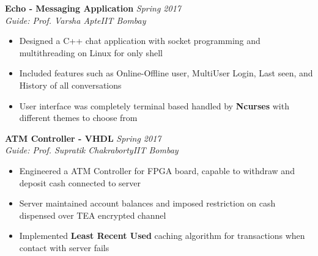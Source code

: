 \documentclass{article}
\begin{document}
\textbf{Echo - Messaging Application} \hfill{\sl \small Spring 2017}
  \vspace{1pt}\\
  {\it Guide: Prof. Varsha Apte}\hfill{\sl \small IIT Bombay}\\
  \vspace{-17pt}
    \begin{itemize}[itemsep = -0.75 mm, leftmargin=*]
      \item Designed a C++ chat application with socket programming and multithreading on Linux for only shell 
      \item Included features such as Online-Offline user, MultiUser Login, Last seen, and History of all conversations
      \item User interface was completely terminal based handled by \textbf{Ncurses} with different themes to choose from
    \end{itemize}
\textbf{ATM Controller - VHDL} \hfill{\sl \small Spring 2017}
  \vspace{1pt}\\
  {\it Guide: Prof. Supratik Chakraborty}\hfill{\sl \small IIT Bombay}\\
  \vspace{-17pt}
    \begin{itemize}[itemsep = -0.75 mm, leftmargin=*]
      \item Engineered a ATM Controller for FPGA board, capable to withdraw and deposit cash connected to server
      \item Server maintained account balances and imposed restriction on cash dispensed over TEA encrypted channel 
      \item Implemented \textbf{Least Recent Used} caching algorithm for transactions when contact with server fails
    \end{itemize}
\end{document}
